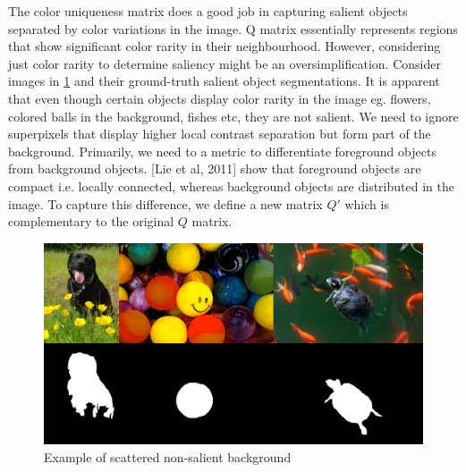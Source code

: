 \documentclass[journal]{IEEEtran}
\begin{document}
{The color uniqueness matrix does a good job in capturing salient objects separated by color variations in the image. Q matrix essentially represents regions that show significant color rarity in their neighbourhood. However, considering just color rarity to determine saliency might be an oversimplification. Consider images in \ref{fig3} and their ground-truth salient object segmentations. It is apparent that even though certain objects display color rarity in the image eg. flowers, colored balls in the background, fishes etc, they are not salient. We need to ignore superpixels that display higher local contrast separation but form part of the background. Primarily, we need to a metric to differentiate foreground objects from background objects. [Lie et al, 2011] show that foreground objects are compact i.e. locally connected, whereas background objects are distributed in the image. To capture this difference, we define a new matrix $Q'$ which is complementary to the original $Q$ matrix.

\begin{figure}[h]
	\includegraphics[width=1\linewidth]{scattered_background}
	\caption{Example of scattered non-salient background}
	\label{fig3}
\end{figure}   

}
\end{document}
